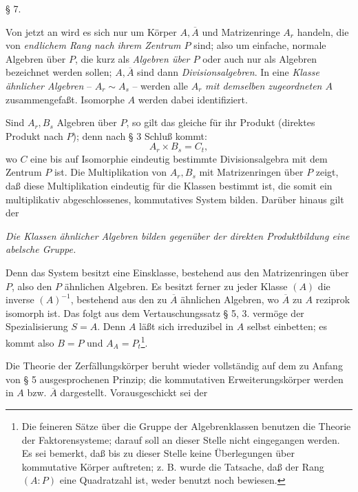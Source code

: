 \begin{center}
§ 7.

\textbf{}
\end{center}

Von jetzt an wird es sich nur um Körper \(A,\overline A\) und Matrizenringe \(A_r\) handeln, die von \emph{endlichem Rang nach ihrem Zentrum \(P\)} sind; also um einfache, normale Algebren über \(P\), die kurz als \emph{Algebren über \(P\)} oder auch nur als Algebren bezeichnet werden sollen; \(A,\overline A\) sind dann \emph{Divisionsalgebren}. In eine \emph{Klasse ähnlicher Algebren} -- \(A_r\sim A_s\) -- werden alle \(A_r\) \emph{mit demselben zugeordneten \(A\)} zusammengefaßt. Isomorphe \(A\) werden dabei identifiziert.

\noindent\textbf{} Sind \(A_r,B_s\) Algebren über \(P\), so gilt das gleiche für ihr Produkt (direktes Produkt nach \(P\)); denn nach § 3 Schluß kommt:
\[
        A_r\times B_s=C_t,
\]
wo \(C\) eine bis auf Isomorphie eindeutig bestimmte Divisionsalgebra mit dem Zentrum \(P\) ist. Die Multiplikation von \(A_r,B_s\) mit Matrizenringen über \(P\) zeigt, daß diese Multiplikation eindeutig für die Klassen bestimmt ist, die somit ein multiplikativ abgeschlossenes, kommutatives System bilden. Darüber hinaus gilt der

\noindent\textbf{} \emph{Die Klassen ähnlicher Algebren bilden gegenüber der direkten Produktbildung eine abelsche Gruppe.}

Denn das System besitzt eine Einsklasse, bestehend aus den Matrizenringen über \(P\), also den \(P\) ähnlichen Algebren. Es besitzt ferner zu jeder Klasse \((A)\) die inverse \((A)^{-1}\), bestehend aus den zu \(\overline A\) ähnlichen Algebren, wo \(\overline A\) zu \(A\) reziprok isomorph ist. Das folgt aus dem Vertauschungssatz § 5, 3. vermöge der Spezialisierung \(S=A\). Denn \(A\) läßt sich irreduzibel in \(A\) selbst einbetten; es kommt also \(B=P\) und \(A_A=P_t\)\footnote{Die feineren Sätze über die Gruppe der Algebrenklassen benutzen die Theorie der Faktorensysteme; darauf soll an dieser Stelle nicht eingegangen werden. Es sei bemerkt, daß bis zu dieser Stelle keine Überlegungen über kommutative Körper auftreten; z. B. wurde die Tatsache, daß der Rang \((A:P)\) eine Quadratzahl ist, weder benutzt noch bewiesen.}.

\noindent\textbf{}\quad Die Theorie der Zerfällungskörper beruht wieder vollständig auf dem zu Anfang von § 5 ausgesprochenen Prinzip; die kommutativen Erweiterungskörper werden in \(A\) bzw. \(\overline A\) dargestellt. Vorausgeschickt sei der

